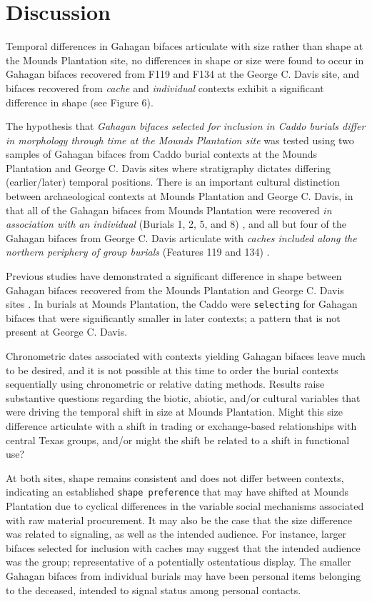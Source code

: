 \documentclass[]{interact}
\theoremstyle{plain}%
\theoremstyle{definition}
\theoremstyle{remark}
\begin{document}
\hypertarget{discussion}{%
\section{Discussion}\label{discussion}}

Temporal differences in Gahagan bifaces articulate with size rather than
shape at the Mounds Plantation site, no differences in shape or size
were found to occur in Gahagan bifaces recovered from F119 and F134 at
the George C. Davis site, and bifaces recovered from \emph{cache} and
\emph{individual} contexts exhibit a significant difference in shape
(see Figure 6).

The hypothesis that \emph{Gahagan bifaces selected for inclusion in
Caddo burials differ in morphology through time at the Mounds Plantation
site} was tested using two samples of Gahagan bifaces from Caddo burial
contexts at the Mounds Plantation and George C. Davis sites where
stratigraphy dictates differing (earlier/later) temporal positions.
There is an important cultural distinction between archaeological
contexts at Mounds Plantation and George C. Davis, in that all of the
Gahagan bifaces from Mounds Plantation were recovered \emph{in
association with an individual} (Burials 1, 2, 5, and 8) \citep{RN8174},
and all but four of the Gahagan bifaces from George C. Davis articulate
with \emph{caches included along the northern periphery of group
burials} (Features 119 and 134) \citep{RN5746, RN8186}.

Previous studies have demonstrated a significant difference in shape
between Gahagan bifaces recovered from the Mounds Plantation and George
C. Davis sites \citep{RN8154}. In burials at Mounds Plantation, the
Caddo were \texttt{selecting} for Gahagan bifaces that were
significantly smaller in later contexts; a pattern that is not present
at George C. Davis.

Chronometric dates associated with contexts yielding Gahagan bifaces
leave much to be desired, and it is not possible at this time to order
the burial contexts sequentially using chronometric or relative dating
methods. Results raise substantive questions regarding the biotic,
abiotic, and/or cultural variables that were driving the temporal shift
in size at Mounds Plantation. Might this size difference articulate with
a shift in trading or exchange-based relationships with central Texas
groups, and/or might the shift be related to a shift in functional use?

At both sites, shape remains consistent and does not differ between
contexts, indicating an established \texttt{shape\ preference} that may
have shifted at Mounds Plantation due to cyclical differences in the
variable social mechanisms associated with raw material procurement. It
may also be the case that the size difference was related to signaling,
as well as the intended audience. For instance, larger bifaces selected
for inclusion with caches may suggest that the intended audience was the
group; representative of a potentially ostentatious display. The smaller
Gahagan bifaces from individual burials may have been personal items
belonging to the deceased, intended to signal status among personal
contacts.
\end{document}
